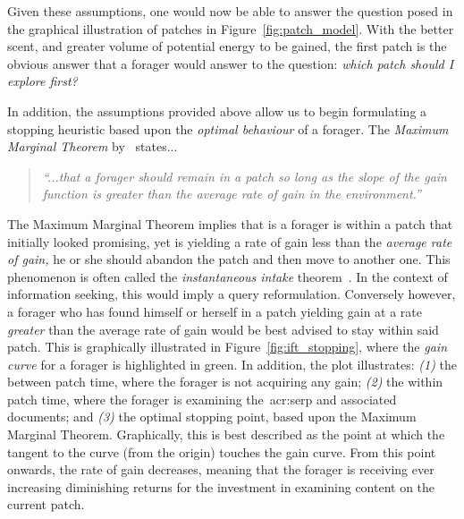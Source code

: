 Given these assumptions, one would now be able to answer the question posed in the graphical illustration of patches in Figure~\ref{fig:patch_model}. With the better scent, and greater volume of potential energy to be gained, the first patch is the obvious answer that a forager would answer to the question: \emph{which patch should I explore first?}

In addition, the assumptions provided above allow us to begin formulating a stopping heuristic based upon the \emph{optimal behaviour} of a forager. The \emph{Maximum Marginal Theorem} by~\cite{charnov1976mvt} states...

\begin{quote}
    \emph{``...that a forager should remain in a patch so long as the slope of the gain function is greater than the average rate of gain in the environment.''}
\end{quote}

The Maximum Marginal Theorem implies that is a forager is within a patch that initially looked promising, yet is yielding a rate of gain less than the \emph{average rate of gain,} he or she should abandon the patch and then move to another one. This phenomenon is often called the \emph{instantaneous intake} theorem~\cite{stephens1986foraging_theory}. In the context of information seeking, this would imply a query reformulation. Conversely however, a forager who has found himself or herself in a patch yielding gain at a rate \emph{greater} than the average rate of gain would be best advised to stay within said patch. This is graphically illustrated in Figure~\ref{fig:ift_stopping}, where the \emph{gain curve} for a forager is highlighted in {\color{dmax_green}green.} In addition, the plot illustrates: \emph{(1)} the between patch time, where the forager is not acquiring any gain; \emph{(2)} the within patch time, where the forager is examining the~\gls{acr:serp} and associated documents; and \emph{(3)} the optimal stopping point, based upon the Maximum Marginal Theorem. Graphically, this is best described as the point at which the tangent to the curve (from the origin) touches the gain curve. From this point onwards, the rate of gain decreases, meaning that the forager is receiving ever increasing diminishing returns for the investment in examining content on the current patch.

